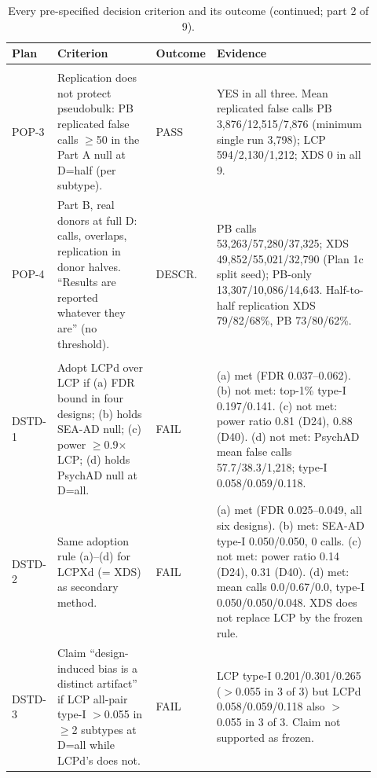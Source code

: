 \begin{table}[p]
\centering\scriptsize
\setlength{\tabcolsep}{2.5pt}\renewcommand{\arraystretch}{1.1}
\caption{Every pre-specified decision criterion and its outcome (continued; part 2 of 9).}\label{tab:criteria2}
\begin{tabular}{@{}>{\raggedright\arraybackslash}p{0.100\linewidth}>{\raggedright\arraybackslash}p{0.285\linewidth}>{\raggedright\arraybackslash}p{0.085\linewidth}>{\raggedright\arraybackslash}p{0.450\linewidth}@{}}
\toprule
Plan & Criterion & Outcome & Evidence \\
\midrule
\multicolumn{4}{@{}>{\raggedright\arraybackslash}p{0.90\linewidth}}{\textbf{Plan 1c (POP\_PREREG: PsychAD population scale)} (continued)} \\
\cmidrule(lr){1-4}
POP-3 & Replication does not protect pseudobulk: PB replicated false calls $\ge$50 in the Part A null at D=half (per subtype). & PASS & YES in all three. Mean replicated false calls PB 3,876/12,515/7,876 (minimum single run 3,798); LCP 594/2,130/1,212; XDS 0 in all 9. \\
POP-4 & Part B, real donors at full D: calls, overlaps, replication in donor halves. ``Results are reported whatever they are'' (no threshold). & DESCR. & PB calls 53,263/57,280/37,325; XDS 49,852/55,021/32,790 (Plan 1c split seed); PB-only 13,307/10,086/14,643. Half-to-half replication XDS 79/82/68\%, PB 73/80/62\%. \\
\addlinespace[3pt]
\multicolumn{4}{@{}>{\raggedright\arraybackslash}p{0.90\linewidth}}{\textbf{Plan 1d (DSTD\_PREREG: LCPd, LCPXd = XDS)}} \\
\cmidrule(lr){1-4}
DSTD-1 & Adopt LCPd over LCP if (a) FDR bound in four designs; (b) holds SEA-AD null; (c) power $\ge$0.9$\times$ LCP; (d) holds PsychAD null at D=all. & FAIL & (a) met (FDR 0.037--0.062). (b) not met: top-1\% type-I 0.197/0.141. (c) not met: power ratio 0.81 (D24), 0.88 (D40). (d) not met: PsychAD mean false calls 57.7/38.3/1,218; type-I 0.058/0.059/0.118. \\
DSTD-2 & Same adoption rule (a)--(d) for LCPXd (= XDS) as secondary method. & FAIL & (a) met (FDR 0.025--0.049, all six designs). (b) met: SEA-AD type-I 0.050/0.050, 0 calls. (c) not met: power ratio 0.14 (D24), 0.31 (D40). (d) met: mean calls 0.0/0.67/0.0, type-I 0.050/0.050/0.048. XDS does not replace LCP by the frozen rule. \\
DSTD-3 & Claim ``design-induced bias is a distinct artifact'' if LCP all-pair type-I $>$0.055 in $\ge$2 subtypes at D=all while LCPd's does not. & FAIL & LCP type-I 0.201/0.301/0.265 ($>$0.055 in 3 of 3) but LCPd 0.058/0.059/0.118 also $>$0.055 in 3 of 3. Claim not supported as frozen. \\

\end{tabular}
\end{table}
